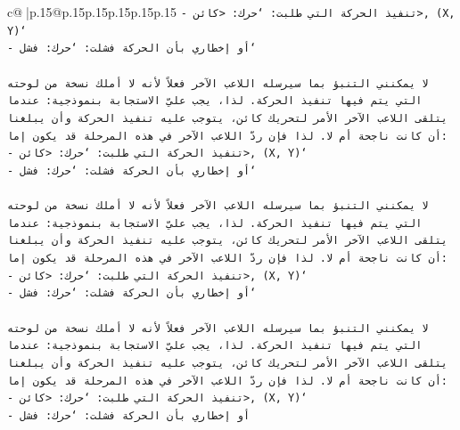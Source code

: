 \documentclass{article}
\begin{document}
{\begin{supertabular}{c@{$\;$}|p{.15\linewidth}@{}p{.15\linewidth}p{.15\linewidth}p{.15\linewidth}p{.15\linewidth}p{.15\linewidth}}
{{{\texttt{{-} تنفيذ الحركة التي طلبت: `حرك: <كائن>, (X, Y)`} \\
\texttt{{-} أو إخطاري بأن الحركة فشلت: `حرك: فشل`} \\
\\ 
\texttt{لا يمكنني التنبؤ بما سيرسله اللاعب الآخر فعلاً لأنه لا أملك نسخة من لوحته التي يتم فيها تنفيذ الحركة. لذا، يجب عليّ الاستجابة بنموذجية: عندما يتلقى اللاعب الآخر الأمر لتحريك كائن، يتوجب عليه تنفيذ الحركة وأن يبلغنا أن كانت ناجحة أم لا. لذا فإن ردّ اللاعب الآخر في هذه المرحلة قد يكون إما:} \\
\texttt{{-} تنفيذ الحركة التي طلبت: `حرك: <كائن>, (X, Y)`} \\
\texttt{{-} أو إخطاري بأن الحركة فشلت: `حرك: فشل`} \\
\\ 
\texttt{لا يمكنني التنبؤ بما سيرسله اللاعب الآخر فعلاً لأنه لا أملك نسخة من لوحته التي يتم فيها تنفيذ الحركة. لذا، يجب عليّ الاستجابة بنموذجية: عندما يتلقى اللاعب الآخر الأمر لتحريك كائن، يتوجب عليه تنفيذ الحركة وأن يبلغنا أن كانت ناجحة أم لا. لذا فإن ردّ اللاعب الآخر في هذه المرحلة قد يكون إما:} \\
\texttt{{-} تنفيذ الحركة التي طلبت: `حرك: <كائن>, (X, Y)`} \\
\texttt{{-} أو إخطاري بأن الحركة فشلت: `حرك: فشل`} \\
\\ 
\texttt{لا يمكنني التنبؤ بما سيرسله اللاعب الآخر فعلاً لأنه لا أملك نسخة من لوحته التي يتم فيها تنفيذ الحركة. لذا، يجب عليّ الاستجابة بنموذجية: عندما يتلقى اللاعب الآخر الأمر لتحريك كائن، يتوجب عليه تنفيذ الحركة وأن يبلغنا أن كانت ناجحة أم لا. لذا فإن ردّ اللاعب الآخر في هذه المرحلة قد يكون إما:} \\
\texttt{{-} تنفيذ الحركة التي طلبت: `حرك: <كائن>, (X, Y)`} \\
\texttt{{-} أو إخطاري بأن الحركة فشلت: `حرك: فشل} \\
            }
        }
    }
     \\ \\


\end{supertabular}}
\end{document}
